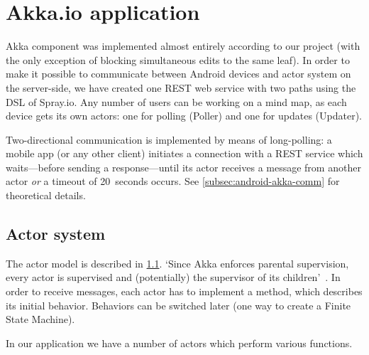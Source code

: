 %
%
%
%
%

\section{Akka.io application}
\label{sec:akka-app}
Akka component was implemented almost entirely according to our project (with the only exception of blocking simultaneous edits to the same leaf). In order to make it possible to communicate between Android devices and actor system on the server-side, we have created one REST web service with two paths using the DSL of Spray.io. Any number of users can be working on a mind map, as each device gets its own actors: one for polling (Poller) and one for updates (Updater).

Two-directional communication is implemented by means of long-polling: a mobile app (or any other client) initiates a connection with a REST service which waits---before sending a response---until its actor receives a message from another actor \emph{or} a timeout of 20~seconds occurs. See \cref{subsec:android-akka-comm} for theoretical details.  

\subsection{Actor system}
\label{subsection:akka-actors}
The actor model is described in \cref{subsection:akka-actors}. `Since Akka enforces parental supervision, every actor is supervised and (potentially) the supervisor of its children'~\cite{AkkaDoc:2013:Actors}. In order to receive messages, each actor has to implement a  method, which describes its initial behavior. Behaviors can be switched later (one way to create a Finite State Machine).

In our application we have a number of actors which perform various functions.

